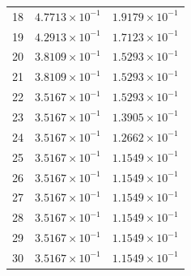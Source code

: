 \begin{table}[H]
\begin{tabular}{@{}rrr@{}}
18 & $4.7713\times10^{-1}$ & $1.9179\times10^{-1}$\\
19 & $4.2913\times10^{-1}$ & $1.7123\times10^{-1}$\\
20 & $3.8109\times10^{-1}$ & $1.5293\times10^{-1}$\\
21 & $3.8109\times10^{-1}$ & $1.5293\times10^{-1}$\\
22 & $3.5167\times10^{-1}$ & $1.5293\times10^{-1}$\\
23 & $3.5167\times10^{-1}$ & $1.3905\times10^{-1}$\\
24 & $3.5167\times10^{-1}$ & $1.2662\times10^{-1}$\\
25 & $3.5167\times10^{-1}$ & $1.1549\times10^{-1}$\\
26 & $3.5167\times10^{-1}$ & $1.1549\times10^{-1}$\\
27 & $3.5167\times10^{-1}$ & $1.1549\times10^{-1}$\\
28 & $3.5167\times10^{-1}$ & $1.1549\times10^{-1}$\\
29 & $3.5167\times10^{-1}$ & $1.1549\times10^{-1}$\\
30 & $3.5167\times10^{-1}$ & $1.1549\times10^{-1}$\\
\bottomrule
\end{tabular}
\end{table}

